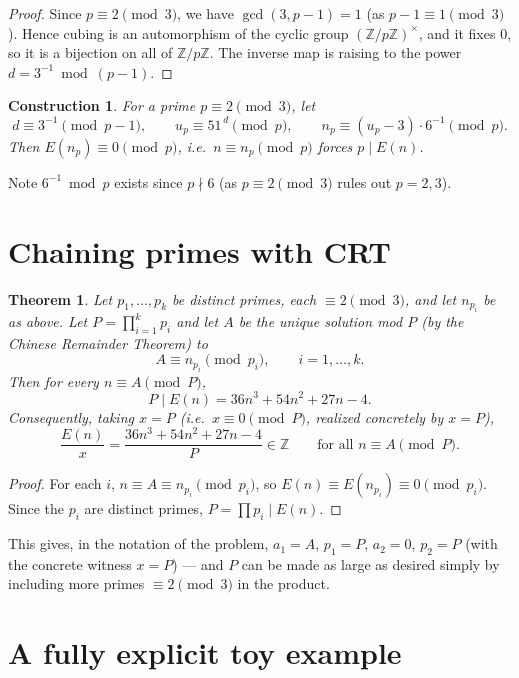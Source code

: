 \documentclass[11pt]{article}
\newtheorem{theorem}{Theorem}
\newtheorem{construction}{Construction}
\begin{document}
\begin{proof}
Since $p \equiv 2 \pmod 3$, we have $\gcd(3, p-1) = 1$ (as $p-1 \equiv 1
\pmod 3$). Hence cubing is an automorphism of the cyclic group
$(\mathbb{Z}/p\mathbb{Z})^\times$, and it fixes $0$, so it is a bijection
on all of $\mathbb{Z}/p\mathbb{Z}$. The inverse map is raising to the
power $d = 3^{-1} \bmod (p-1)$.
\end{proof}

\begin{construction}
For a prime $p \equiv 2 \pmod 3$, let
\[
d \equiv 3^{-1} \pmod{p-1}, \qquad
u_p \equiv 51^{\,d} \pmod p, \qquad
n_p \equiv (u_p - 3)\cdot 6^{-1} \pmod p .
\]
Then $E(n_p) \equiv 0 \pmod p$, i.e.\ $n \equiv n_p \pmod p$ forces $p \mid
E(n)$.
\end{construction}

Note $6^{-1} \bmod p$ exists since $p \nmid 6$ (as $p \equiv 2 \pmod 3$
rules out $p=2,3$).

\section{Chaining primes with CRT}

\begin{theorem}
Let $p_1, \dots, p_k$ be distinct primes, each $\equiv 2 \pmod 3$, and let
$n_{p_i}$ be as above. Let $P = \prod_{i=1}^k p_i$ and let $A$ be the
unique solution mod $P$ (by the Chinese Remainder Theorem) to
\[
A \equiv n_{p_i} \pmod{p_i}, \qquad i = 1,\dots,k .
\]
Then for every $n \equiv A \pmod P$,
\[
P \mid E(n) = 36n^3+54n^2+27n-4 .
\]
Consequently, taking $x = P$ (i.e.\ $x \equiv 0 \pmod P$, realized concretely by
$x=P$),
\[
\frac{E(n)}{x} = \frac{36n^3+54n^2+27n-4}{P} \in \mathbb{Z}
\qquad \text{for all } n \equiv A \pmod P.
\]
\end{theorem}

\begin{proof}
For each $i$, $n \equiv A \equiv n_{p_i} \pmod{p_i}$, so $E(n) \equiv
E(n_{p_i}) \equiv 0 \pmod{p_i}$. Since the $p_i$ are distinct primes,
$P = \prod p_i \mid E(n)$.
\end{proof}

This gives, in the notation of the problem, $a_1 = A$, $p_1 = P$,
$a_2 = 0$, $p_2 = P$ (with the concrete witness $x = P$) --- and $P$ can
be made as large as desired simply by including more primes $\equiv 2
\pmod 3$ in the product.

\section{A fully explicit toy example}
\end{document}
